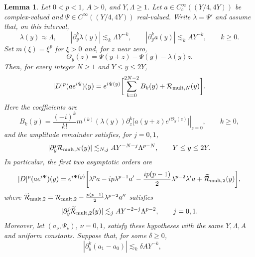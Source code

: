 \documentclass[11pt]{amsart}
\newtheorem{lemma}[theorem]{Lemma}
\theoremstyle{definition}
\theoremstyle{remark}
\numberwithin{equation}{section}
\newcommand{\mc}[1]{\mathcal{#1}}
\begin{document}
\begin{lemma}\label{lem:appendix_oscillatory_multiplier}
    Let $0<p<1$, $A>0$, and $Y, \Lambda\geq1$. Let $a\in C_c^\infty((Y/4,4Y))$ be complex-valued and $\Psi\in C^\infty((Y/4,4Y))$ real-valued. Write $\lambda=\Psi'$ and assume that, on this interval,
    \[
        \lambda(y)\approx\Lambda,\qquad
        |\partial_y^k\lambda(y)|\lesssim_k\Lambda Y^{-k},\qquad
        |\partial_y^ka(y)|\lesssim_k A Y^{-k},
        \qquad k\geq0.
    \]
    Set $m(\xi)=\xi^p$ for $\xi>0$ and, for $z$ near zero,
    \[
        \Theta_y(z)=\Psi(y+z)-\Psi(y)-\lambda(y)z.
    \]
    Then, for every integer $N\geq1$ and $Y\leq y\leq2Y$,
    \begin{equation}\label{eqn:appendix_oscillatory_multiplier_expansion}
        |D|^p(ae^{i\Psi})(y)
        =e^{i\Psi(y)}\biggl[\sum_{k=0}^{2N-2}B_k(y)
        +\mc{R}_{\textup{mult},N}(y)\biggr].
    \end{equation}
    Here the coefficients are
    \begin{equation}\label{eqn:appendix_oscillatory_multiplier_coefficients}
        B_k(y)=\frac{(-i)^k}{k!}m^{(k)}(\lambda(y))
        \left.\partial_z^k
        \bigl[a(y+z)e^{i\Theta_y(z)}\bigr]\right|_{z=0},
        \qquad k\geq0,
    \end{equation}
    and the amplitude remainder satisfies, for $j=0,1$,
    \begin{equation}\label{eqn:appendix_oscillatory_multiplier_amplitude_remainder}
        |\partial_y^j\mc{R}_{\textup{mult},N}(y)|\lesssim_{N,j} A Y^{-N-j}\Lambda^{p-N},
        \qquad Y\leq y\leq2Y.
    \end{equation}
    In particular, the first two asymptotic orders are
    \begin{equation}\label{eqn:appendix_oscillatory_multiplier_two_term_expansion}
        |D|^p(ae^{i\Psi})(y)
        =e^{i\Psi(y)}\biggl[\lambda^pa-ip\lambda^{p-1}a'
        -\frac{ip(p-1)}2\lambda^{p-2}\lambda'a
        +\widetilde{\mc{R}}_{\textup{mult},2}(y)\biggr],
    \end{equation}
    where $\widetilde{\mc{R}}_{\textup{mult},2}
    =\mc{R}_{\textup{mult},2}-\frac{p(p-1)}2\lambda^{p-2}a''$ satisfies
    \[
        |\partial_y^j\widetilde{\mc{R}}_{\textup{mult},2}(y)|
        \lesssim_j AY^{-2-j}\Lambda^{p-2},\qquad j=0,1.
    \]
    Moreover, let $(a_\nu,\Psi_\nu)$, $\nu=0,1$, satisfy these hypotheses with the same $Y,\Lambda,A$ and uniform constants. Suppose that, for some $\delta\geq0$,
    \[
        |\partial_y^k(a_1-a_0)|\lesssim_k\delta A Y^{-k},
        \qquad
\]
\end{lemma}
\end{document}
